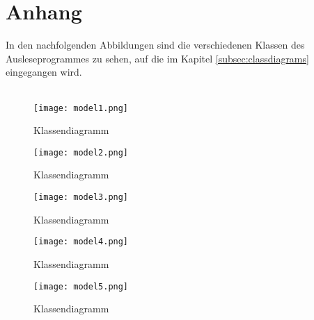 \chapter*{Anhang}
\label{cha:anh}
\captionsetup{list=false}




\listofappendix



\clearpage

\label{sec:anh:class}

In den nachfolgenden Abbildungen sind die verschiedenen Klassen des Ausleseprogrammes zu sehen, auf die im Kapitel \ref{subsec:classdiagrams} eingegangen wird.\\\\

\begin{figure}[H]
\centering
\texttt{[image: model1.png]}
\caption[]{Klassendiagramm}
\label{fig:classdia1}
\end{figure}

\begin{figure}[H]
\centering
\texttt{[image: model2.png]}
\caption[]{Klassendiagramm}
\label{fig:classdia2}
\end{figure}

\begin{figure}[H]
\centering
\texttt{[image: model3.png]}
\caption[]{Klassendiagramm}
\label{fig:classdia3}
\end{figure}

\begin{figure}[H]
\centering
\texttt{[image: model4.png]}
\caption[]{Klassendiagramm}
\label{fig:classdia4}
\end{figure}

\begin{figure}[H]
\centering
\texttt{[image: model5.png]}
\caption[]{Klassendiagramm}
\label{fig:classdia5}
\end{figure}

